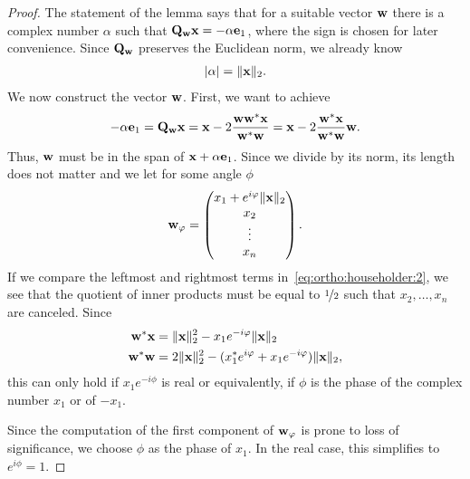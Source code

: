 \begin{proof}
  The statement of the lemma says that for a suitable vector $\mathbf w$
  there is a complex number $\alpha$ such that
  $\mathbf Q_{\mathbf w} \mathbf x = -\alpha \mathbf e_1$, where the sign is chosen for
  later convenience. Since $\mathbf Q_{\mathbf w}$ preserves the Euclidean norm,
  we already know
  \begin{gather}
    \lvert\alpha\rvert = \lVert\mathbf x\rVert_2.
  \end{gather}
  We now construct the vector $\mathbf w$. First, we want to achieve
  \begin{gather}
    \label{eq:ortho:householder:2}
    -\alpha\mathbf e_1 = \mathbf Q_{\mathbf w} \mathbf x
    = \mathbf x - 2 \frac{\mathbf w\mathbf w^*\mathbf x}{\mathbf w^*\mathbf w}
    = \mathbf x - 2 \frac{\mathbf w^*\mathbf x}{\mathbf w^*\mathbf w}\mathbf w.
  \end{gather}
  Thus, $\mathbf w$ must be in the span of $\mathbf x+\alpha \mathbf e_1$. Since we divide by
  its norm, its length does not matter and we let for some angle $\phi$
  \begin{gather}
    \mathbf w_\varphi =
    \begin{pmatrix}
      x_1 + e^{i\varphi} \lVert\mathbf x\rVert_2\\x_2\\\vdots\\x_n
    \end{pmatrix}.
  \end{gather}
  If we compare the leftmost and rightmost terms
  in~\eqref{eq:ortho:householder:2}, we see that the quotient of inner
  products must be equal to $\nicefrac12$ such that $x_2,\dots,x_n$
  are canceled. Since
  \begin{align}
    \mathbf w^*\mathbf x &= \lVert\mathbf x\rVert_2^2 - x_1 e^{-i\varphi} \lVert\mathbf x\rVert_2
    \\
    \mathbf w^*\mathbf w &= 2\lVert\mathbf x\rVert_2^2 - (x_1^*e^{i\varphi} + x_1 e^{-i\varphi})\lVert\mathbf x\rVert_2,
  \end{align}
  this can only hold if $x_1 e^{-i\phi}$ is real or equivalently, if
  $\phi$ is the phase of the complex number $x_1$ or of $-x_1$.

  Since the computation of the first component of $\mathbf w_\varphi$ is prone
  to loss of significance, we choose $\phi$ as the phase of $x_1$. In
  the real case, this simplifies to $e^{i\phi} = 1$.
\end{proof}


